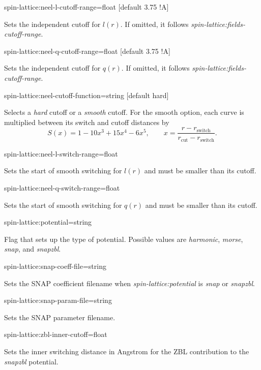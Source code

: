 {\zicf spin-lattice:neel-l-cutoff-range=float [default 3.75 !A]}
Sets the independent cutoff for $l(r)$. If omitted, it follows \textit{spin-lattice:fields-cutoff-range}.

{\zicf spin-lattice:neel-q-cutoff-range=float [default 3.75 !A]}
Sets the independent cutoff for $q(r)$. If omitted, it follows \textit{spin-lattice:fields-cutoff-range}.

{\zicf spin-lattice:neel-cutoff-function=string [default hard]}
Selects a \textit{hard} cutoff or a \textit{smooth} cutoff. For the smooth option, each curve is multiplied between its switch and cutoff distances by
\[
S(x)=1-10x^3+15x^4-6x^5,\qquad x=\frac{r-r_{\mathrm{switch}}}{r_{\mathrm{cut}}-r_{\mathrm{switch}}}.
\]

{\zicf spin-lattice:neel-l-switch-range=float}
Sets the start of smooth switching for $l(r)$ and must be smaller than its cutoff.

{\zicf spin-lattice:neel-q-switch-range=float}
Sets the start of smooth switching for $q(r)$ and must be smaller than its cutoff. 

 {\zicf spin-lattice:potential=string}
 Flag that sets up the type of potential. Possible values are \textit{harmonic}, \textit{morse}, \textit{snap}, and \textit{snapzbl}.

{\zicf spin-lattice:snap-coeff-file=string}
Sets the SNAP coefficient filename when \textit{spin-lattice:potential} is \textit{snap} or \textit{snapzbl}.

{\zicf spin-lattice:snap-param-file=string}
Sets the SNAP parameter filename.

{\zicf spin-lattice:zbl-inner-cutoff=float}
Sets the inner switching distance in Angstrom for the ZBL contribution to the \textit{snapzbl} potential.

